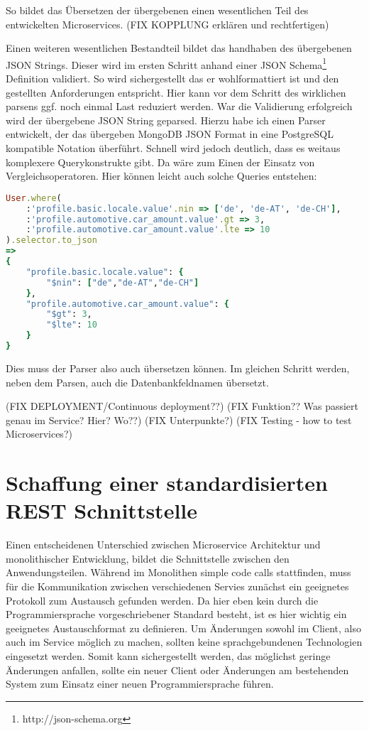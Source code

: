 \noindent So bildet das Übersetzen der übergebenen einen wesentlichen Teil des entwickelten Microservices. (FIX KOPPLUNG erklären und rechtfertigen)

Einen weiteren wesentlichen Bestandteil bildet das handhaben des übergebenen JSON Strings. Dieser wird im ersten Schritt anhand einer JSON Schema\footnote{http://json-schema.org} Definition validiert. So wird sichergestellt das er wohlformattiert ist und den gestellten Anforderungen entspricht. Hier kann vor dem Schritt des wirklichen parsens ggf. noch einmal Last reduziert werden. War die Validierung erfolgreich wird der übergebene JSON String geparsed. Hierzu habe ich einen Parser entwickelt, der das übergeben MongoDB JSON Format in eine PostgreSQL kompatible Notation überführt. Schnell wird jedoch deutlich, dass es weitaus komplexere Querykonstrukte gibt. Da wäre zum Einen der Einsatz von Vergleichsoperatoren. Hier können leicht auch solche Queries entstehen:

\begin{lstlisting}[language=Ruby]
User.where(
    :'profile.basic.locale.value'.nin => ['de', 'de-AT', 'de-CH'],
    :'profile.automotive.car_amount.value'.gt => 3,
    :'profile.automotive.car_amount.value'.lte => 10
).selector.to_json
=> 
{
    "profile.basic.locale.value": {
        "$nin": ["de","de-AT","de-CH"]
    },
    "profile.automotive.car_amount.value": {
        "$gt": 3,
        "$lte": 10
    }
}
\end{lstlisting}

\noindent Dies muss der Parser also auch übersetzen können. Im gleichen Schritt werden, neben dem Parsen, auch die Datenbankfeldnamen übersetzt.

(FIX DEPLOYMENT/Continuous deployment??)
(FIX Funktion?? Was passiert genau im Service? Hier? Wo??)
(FIX Unterpunkte?)
(FIX Testing - how to test Microservices?)

\section{Schaffung einer standardisierten REST Schnittstelle}
Einen entscheidenen Unterschied zwischen Microservice Architektur und monolithischer Entwicklung, bildet die Schnittstelle zwischen den Anwendungsteilen. Während im Monolithen simple code calls stattfinden, muss für die Kommunikation zwischen verschiedenen Servies zunächst ein geeignetes Protokoll zum Austausch gefunden werden.
Da hier eben kein durch die Programmiersprache vorgeschriebener Standard besteht, ist es hier wichtig ein geeignetes Austauschformat zu definieren.
Um Änderungen sowohl im Client, also auch im Service möglich zu machen, sollten keine sprachgebundenen Technologien eingesetzt werden. Somit kann sichergestellt werden, das möglichst geringe Änderungen anfallen, sollte ein neuer Client oder Änderungen am bestehenden System zum Einsatz einer neuen Programmiersprache führen.

